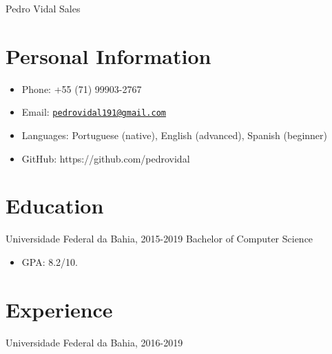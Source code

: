 \documentclass[letterpaper]{article}
\def\name{Pedro Vidal Sales}
\begin{document}
{\huge \name}


\vspace{0.25in}

    

\section*{Personal Information}
    \begin{itemize}
        \item Phone: +55 (71) 99903-2767
        \item Email: \href{mailto:pedrovidal191@gmail.com}{\tt pedrovidal191@gmail.com}
        \item Languages: Portuguese (native), English (advanced), Spanish (beginner)
        \item GitHub: https://github.com/pedrovidal
    \end{itemize}

\section*{Education}

  Universidade Federal da Bahia, 2015-2019
  Bachelor of Computer Science

  \begin{itemize}
    \item GPA: 8.2/10.
  \end{itemize}

\section*{Experience}
  Universidade Federal da Bahia, 2016-2019
  
\end{document}
